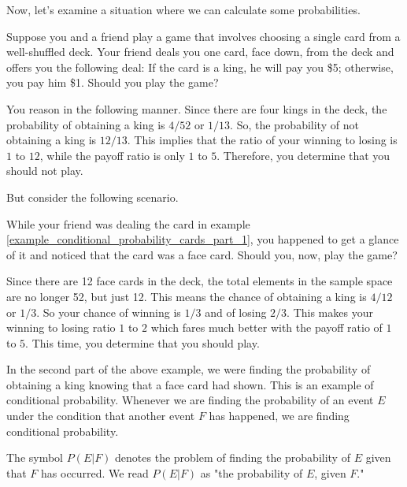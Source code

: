 Now, let’s examine a situation where we can calculate some probabilities.
\begin{example}\label{example_conditional_probability_cards_part_1}
    Suppose you and a friend play a game that involves choosing a single card from a well-shuffled deck. Your friend deals you one card, face down, from the deck and offers you the following deal: If the card is a king, he will pay you \$5; otherwise, you pay him \$1. Should you play the game?
\end{example}
\begin{solution}
    You reason in the following manner. Since there are four kings in the deck, the probability of obtaining a king is $4/52$ or $1/13$. So, the probability of not obtaining a king is $12/13$. This implies that the ratio of your winning to losing is $1$ to $12$, while the payoff ratio is only $1$ to $5$. Therefore, you determine that you should not play.
\end{solution}
But consider the following scenario.
\begin{example}\label{example_conditional_probability_cards_part_2}
    While your friend was dealing the card in example \ref{example_conditional_probability_cards_part_1}, you happened to get a glance of it and noticed that the card was a face card. Should you, now, play the game?
\end{example}

\begin{solution}
    Since there are 12 face cards in the deck, the total elements in the sample space are no longer 52, but just 12. This means the chance of obtaining a king is $4/12$ or $1/3$. So your chance of winning is $1/3$ and of losing $2/3$. This makes your winning to losing ratio $1$ to $2$ which fares much better with the payoff ratio of $1$ to $5$. This time, you determine that you should play.
\end{solution}

In the second part of the above example, we were finding the probability of obtaining a king knowing that a face card had shown. This is an example of conditional probability. Whenever we are finding the probability of an event $E$ under the condition that another event $F$ has happened, we are finding conditional probability.

The symbol $P(E | F)$ denotes the problem of finding the probability of $E$ given that $F$ has occurred. We read $P(E | F)$ as "the probability of $E$, given $F$."

